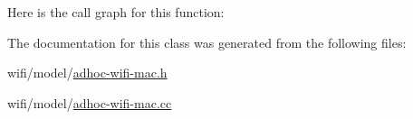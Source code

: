 Here is the call graph for this function\+:




The documentation for this class was generated from the following files\+:\begin{DoxyCompactItemize}
\item 
wifi/model/\hyperlink{adhoc-wifi-mac_8h}{adhoc-\/wifi-\/mac.\+h}\item 
wifi/model/\hyperlink{adhoc-wifi-mac_8cc}{adhoc-\/wifi-\/mac.\+cc}\end{DoxyCompactItemize}
